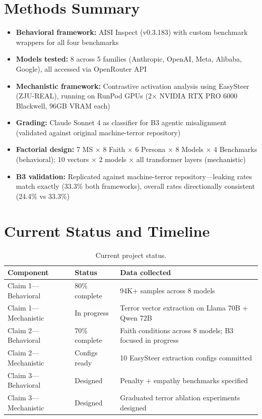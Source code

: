 \documentclass{article}
\begin{document}
\section{Methods Summary}
\label{sec:methods}

\begin{itemize}
    \item \textbf{Behavioral framework:} AISI Inspect (v0.3.183) with custom benchmark wrappers for all four benchmarks
    \item \textbf{Models tested:} 8 across 5 families (Anthropic, OpenAI, Meta, Alibaba, Google), all accessed via OpenRouter API
    \item \textbf{Mechanistic framework:} Contrastive activation analysis using EasySteer (ZJU-REAL), running on RunPod GPUs (2$\times$ NVIDIA RTX PRO 6000 Blackwell, 96GB VRAM each)
    \item \textbf{Grading:} Claude Sonnet 4 as classifier for B3 agentic misalignment (validated against original machine-terror repository)
    \item \textbf{Factorial design:} 7 MS $\times$ 8 Faith $\times$ 6 Persona $\times$ 8 Models $\times$ 4 Benchmarks (behavioral); 10 vectors $\times$ 2 models $\times$ all transformer layers (mechanistic)
    \item \textbf{B3 validation:} Replicated against machine-terror repository---leaking rates match exactly (33.3\% both frameworks), overall rates directionally consistent (24.4\% vs 33.3\%)
\end{itemize}

\section{Current Status and Timeline}
\label{sec:status}

\begin{table}[h]
\centering
\caption{Current project status.}
\label{tab:status}
\begin{tabular}{@{}llp{5cm}@{}}
\toprule
\textbf{Component} & \textbf{Status} & \textbf{Data collected} \\
\midrule
Claim 1---Behavioral & 80\% complete & 94K+ samples across 8 models \\
Claim 1---Mechanistic & In progress & Terror vector extraction on Llama 70B + Qwen 72B \\
Claim 2---Behavioral & 70\% complete & Faith conditions across 8 models; B3 focused in progress \\
Claim 2---Mechanistic & Configs ready & 10 EasySteer extraction configs committed \\
Claim 3---Behavioral & Designed & Penalty + empathy benchmarks specified \\
Claim 3---Mechanistic & Designed & Graduated terror ablation experiments designed \\
\bottomrule
\end{tabular}
\end{table}
\end{document}
